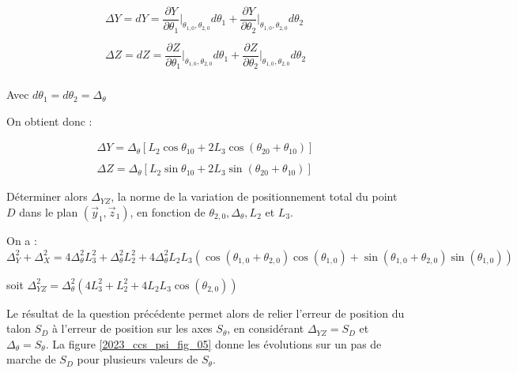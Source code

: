 \begin{corrige}
\begin{enumerate}
\begin{align*}
\Delta Y=d Y=\dfrac{\partial Y}{\partial \theta_1}\vert_{\theta_{1,0},\theta_{2,0}}d\theta_1+\dfrac{\partial Y}{\partial \theta_2}\vert_{\theta_{1,0},\theta_{2,0}}d\theta_2\\
\\
\Delta Z=d Z=\dfrac{\partial Z}{\partial \theta_1}\vert_{\theta_{1,0},\theta_{2,0}}d\theta_1+\dfrac{\partial Z}{\partial \theta_2}\vert_{\theta_{1,0},\theta_{2,0}}d\theta_2\\
\end{align*}

Avec $d\theta_1=d\theta_2=\Delta_{\theta}$

On obtient donc : 

\begin{align*}
\Delta Y=\Delta_{\theta}\left[L_2\cos\theta_{10}+2L_3\cos(\theta_{20}+\theta_{10})\right]\\
\\
\Delta Z=\Delta_{\theta}\left[L_2\sin\theta_{10}+2L_3\sin(\theta_{20}+\theta_{10})\right]
\end{align*}
\end{enumerate}

\end{corrige}
\else
\fi

\begin{question}
\label{2023_ccs_psi_q_03}
Déterminer alors $\Delta_{Y Z}$, la norme de la variation de positionnement total du point $D$ dans le plan $\left(\vec{y}_{1}, \vec{z}_{1}\right)$, en fonction de $\theta_{2,0}, \Delta_{\theta}, L_{2}$ et $L_{3}$.
\end{question}
\ifprof
\begin{corrige}
 On a : 
$\Delta_{Y}^2 + \Delta_{X}^2 = 4\Delta_{\theta}^2L_3^2 + \Delta_{\theta}^2L_2^2 
+ 4\Delta_{\theta}^2 L_2 L_3 \left( \cos \left(\theta_{1,0}+ \theta_{2,0}\right)  \cos \left(\theta_{1,0}\right)
+  \sin \left(\theta_{1,0}+ \theta_{2,0}\right)  \sin \left(\theta_{1,0}\right) \right)$

soit 
$\Delta_{YZ}^2 = \Delta_{\theta}^2 \left(4L_3^2 + L_2^2 
+ 4 L_2 L_3 \cos \left(\theta_{2,0} \right)\right)$

\end{corrige}
\else
\fi


Le résultat de la question précédente permet alors de relier l'erreur de position du talon $S_{D}$ à l'erreur de position sur les axes $S_{\theta}$, en considérant $\Delta_{Y Z}=S_{D}$ et $\Delta_{\theta}=S_{\theta}$. La figure \ref{2023_ccs_psi_fig_05} donne les évolutions sur un pas de marche de $S_{D}$ pour plusieurs valeurs de $S_{\theta}$.\\

